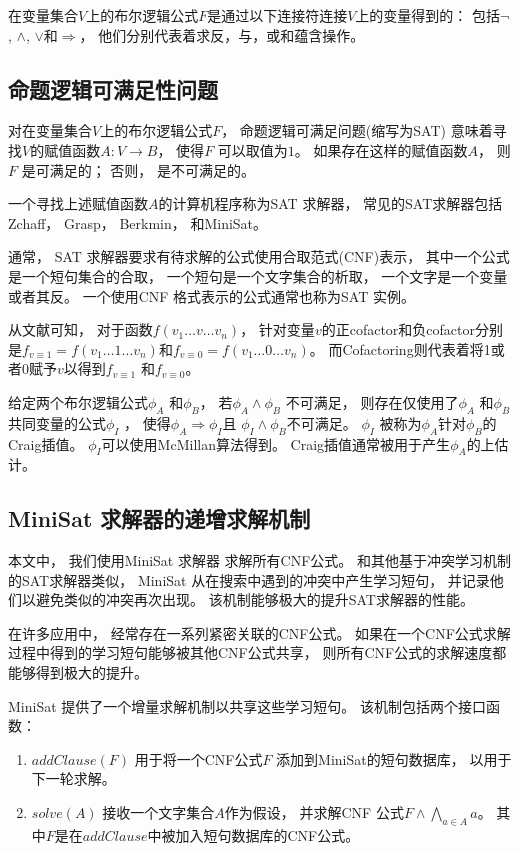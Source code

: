 在变量集合$V$上的布尔逻辑公式$F$是通过以下连接符连接$V$上的变量得到的：
包括$\neg$, $\wedge$, $\vee$和$\Rightarrow$，
他们分别代表着求反，与，或和蕴含操作。

\subsection{命题逻辑可满足性问题}

对在变量集合$V$上的布尔逻辑公式$F$，
命题逻辑可满足问题(缩写为SAT)
意味着寻找$V$的赋值函数$A:V\to B$，
使得$F$ 可以取值为$1$。
如果存在这样的赋值函数$A$，
则$F$ 是可满足的；
否则，
是不可满足的。

一个寻找上述赋值函数$A$的计算机程序称为SAT 求解器，
常见的SAT求解器包括Zchaff，
Grasp，
Berkmin，
和MiniSat。


通常，
SAT 求解器要求有待求解的公式使用合取范式(CNF)表示，
其中一个公式是一个短句集合的合取，
一个短句是一个文字集合的析取，
一个文字是一个变量或者其反。
一个使用CNF 格式表示的公式通常也称为SAT 实例。


从文献可知，
对于函数$f(v_1\dots v\dots v_n)$，
针对变量$v$的正cofactor和负cofactor分别是$f_{v\equiv 1}=f(v_1\dots 1\dots v_n)$和$f_{v\equiv 0}=f(v_1\dots 0\dots v_n)$。
而Cofactoring则代表着将1或者0赋予$v$以得到$f_{v\equiv 1}$ 和$f_{v\equiv 0}$。

给定两个布尔逻辑公式$\phi_A$ 和$\phi_B$，
若$\phi_A\wedge \phi_B$ 不可满足，
则存在仅使用了$\phi_A$ 和$\phi_B$共同变量的公式$\phi_I$ ，
 使得$\phi_A\Rightarrow \phi_I$且
$\phi_I\wedge \phi_B$不可满足。
$\phi_I$ 被称为$\phi_A$针对$\phi_B$的Craig插值。
$\phi_I$可以使用McMillan算法得到。
Craig插值通常被用于产生$\phi_A$的上估计。


\subsection{MiniSat 求解器的递增求解机制}\label{subsec_incsat}

本文中，
我们使用MiniSat 求解器 求解所有CNF公式。
和其他基于冲突学习机制的SAT求解器类似，
MiniSat 从在搜索中遇到的冲突中产生学习短句，
并记录他们以避免类似的冲突再次出现。
该机制能够极大的提升SAT求解器的性能。

在许多应用中，
经常存在一系列紧密关联的CNF公式。
如果在一个CNF公式求解过程中得到的学习短句能够被其他CNF公式共享，
则所有CNF公式的求解速度都能够得到极大的提升。

MiniSat 提供了一个增量求解机制以共享这些学习短句。
该机制包括两个接口函数：
\begin{enumerate}
\item
$addClause(F)$ 用于将一个CNF公式$F$ 添加到MiniSat的短句数据库，
以用于下一轮求解。
\item
$solve(A)$ 接收一个文字集合$A$作为假设，
并求解CNF 公式$F\wedge \bigwedge_{a\in A} a$。
其中$F$是在$addClause$中被加入短句数据库的CNF公式。
\end{enumerate}


